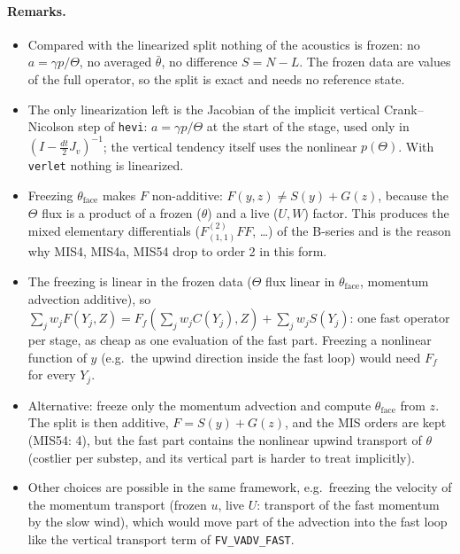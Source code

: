 \documentclass[11pt,a4paper]{article}
\newcommand{\code}[1]{\texttt{#1}}
\begin{document}
\paragraph{Remarks.}
\begin{itemize}
\item Compared with the linearized split nothing of the acoustics is frozen: no $a=\gamma p/\Theta$,
  no averaged $\bar\theta$, no difference $S=N-L$. The frozen data are values of the full operator,
  so the split is exact and needs no reference state.
\item The only linearization left is the Jacobian of the implicit vertical Crank--Nicolson step of
  \code{hevi}: $a=\gamma p/\Theta$ at the start of the stage, used only in
  $(I-\tfrac{dt}{2}J_v)^{-1}$; the vertical tendency itself uses the nonlinear $p(\Theta)$. With
  \code{verlet} nothing is linearized.
\item Freezing $\theta_\mathrm{face}$ makes $F$ non-additive: $F(y,z)\ne S(y)+G(z)$, because the
  $\Theta$ flux is a product of a frozen ($\theta$) and a live ($U,W$) factor. This produces the
  mixed elementary differentials ($F^{(2)}_{(1,1)}FF$, \dots) of the B-series and is the reason why
  MIS4, MIS4a, MIS54 drop to order 2 in this form.
\item The freezing is linear in the frozen data ($\Theta$ flux linear in $\theta_\mathrm{face}$, momentum
  advection additive), so $\sum_jw_jF(Y_j,Z)=F_f(\sum_jw_jC(Y_j),Z)+\sum_jw_jS(Y_j)$: one fast
  operator per stage, as cheap as one evaluation of the fast part. Freezing a nonlinear function of
  $y$ (e.g.\ the upwind direction inside the fast loop) would need $F_f$ for every $Y_j$.
\item Alternative: freeze only the momentum advection and compute $\theta_\mathrm{face}$ from $z$.
  The split is then additive, $F=S(y)+G(z)$, and the MIS orders are kept (MIS54: 4), but the fast part
  contains the nonlinear upwind transport of $\theta$ (costlier per substep, and its vertical part is
  harder to treat implicitly).
\item Other choices are possible in the same framework, e.g.\ freezing the velocity of the
  momentum transport (frozen $u$, live $U$: transport of the fast momentum by the slow wind), which
  would move part of the advection into the fast loop like the vertical transport term of
  \code{FV\_VADV\_FAST}.
\end{itemize}
\end{document}
